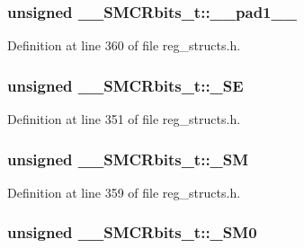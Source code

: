 \hypertarget{union_____s_m_c_rbits__t_acc2771fc7bef1f9912bbe13009c1ccb7}{
\subsubsection[{\+\_\+\+\_\+pad1\+\_\+\+\_\+}]{\setlength{\rightskip}{0pt plus 5cm}unsigned \+\_\+\+\_\+\+S\+M\+C\+Rbits\+\_\+t\+::\+\_\+\+\_\+pad1\+\_\+\+\_\+}}\label{union_____s_m_c_rbits__t_acc2771fc7bef1f9912bbe13009c1ccb7}


Definition at line 360 of file reg\+\_\+structs.\+h.

\hypertarget{union_____s_m_c_rbits__t_a42f1fc801e912753b7c73de029b38786}{
\subsubsection[{\+\_\+\+S\+E}]{\setlength{\rightskip}{0pt plus 5cm}unsigned \+\_\+\+\_\+\+S\+M\+C\+Rbits\+\_\+t\+::\+\_\+\+S\+E}}\label{union_____s_m_c_rbits__t_a42f1fc801e912753b7c73de029b38786}


Definition at line 351 of file reg\+\_\+structs.\+h.

\hypertarget{union_____s_m_c_rbits__t_a61d30a94b0e4946af3d9f7fb1efe0ca1}{
\subsubsection[{\+\_\+\+S\+M}]{\setlength{\rightskip}{0pt plus 5cm}unsigned \+\_\+\+\_\+\+S\+M\+C\+Rbits\+\_\+t\+::\+\_\+\+S\+M}}\label{union_____s_m_c_rbits__t_a61d30a94b0e4946af3d9f7fb1efe0ca1}


Definition at line 359 of file reg\+\_\+structs.\+h.

\hypertarget{union_____s_m_c_rbits__t_a9a63896db6eb16eff5b3a087850b74a9}{
\subsubsection[{\+\_\+\+S\+M0}]{\setlength{\rightskip}{0pt plus 5cm}unsigned \+\_\+\+\_\+\+S\+M\+C\+Rbits\+\_\+t\+::\+\_\+\+S\+M0}}\label{union_____s_m_c_rbits__t_a9a63896db6eb16eff5b3a087850b74a9}



